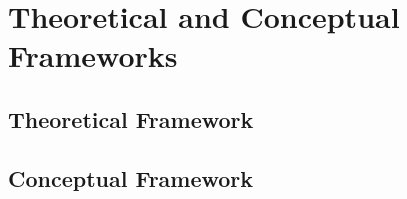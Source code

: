 \chapter{Theoretical and Conceptual Frameworks}\label{ch:tf-cf}
\section{Theoretical Framework}
\section{Conceptual Framework}